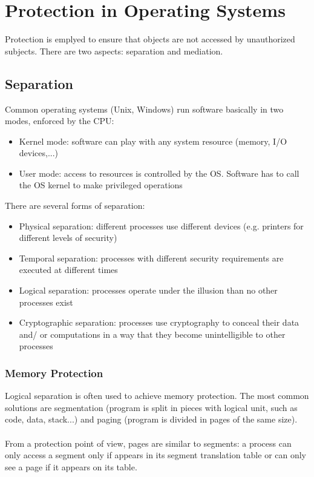 \documentclass[10pt,a4paper]{report}
\begin{document}
\section{Protection in Operating Systems}
Protection is emplyed to ensure that objects are not accessed by unauthorized subjects. There are two aspects: separation and mediation.
\subsection{Separation}
Common operating systems (Unix, Windows) run software basically in two modes, enforced by the CPU:
\begin{itemize}
\item Kernel mode: software can play with any system resource (memory, I/O devices,...)
\item User mode: access to resources is controlled by the OS. Software has to call the OS kernel to make privileged
operations
\end{itemize}
There are several forms of separation:
\begin{itemize}
\item Physical separation: different processes use different devices (e.g. printers for different levels of security)
\item Temporal separation: processes with different security requirements are executed at different times
\item Logical separation: processes operate under the illusion than no other processes exist
\item Cryptographic separation: processes use cryptography to conceal their data and/ or computations in a way that they become unintelligible to other processes
\end{itemize}
\subsubsection{Memory Protection}
Logical separation is often used to achieve memory protection. The most common solutions are segmentation (program is split in pieces with logical unit, such as code, data, stack...) and paging (program is divided in pages of the same size).\\
\\
From a protection point of view, pages are similar to segments: a process can only  access a segment only if appears in its segment translation table or can only see a page if it appears on its table.
\end{document}
